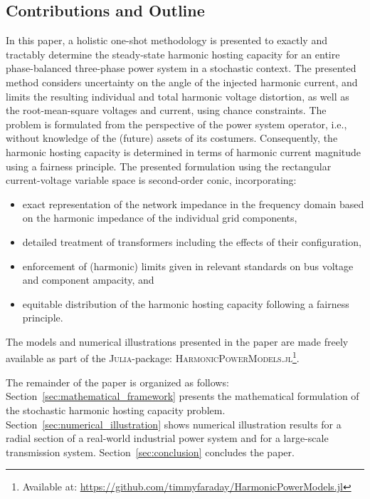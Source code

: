 \subsection{Contributions and Outline}
\label{sec:contribution_and_outline}

In this paper, a holistic one-shot methodology is presented to exactly and tractably determine the steady-state harmonic hosting capacity for an entire phase-balanced three-phase power system in a stochastic context. The presented method considers uncertainty on the angle of the injected harmonic current, and limits the resulting individual and total harmonic voltage distortion, as well as the root-mean-square voltages and current, using chance constraints. The problem is formulated from the perspective of the power system operator, i.e., without knowledge of the (future) assets of its costumers. Consequently, the harmonic hosting capacity is determined in terms of harmonic current magnitude using a fairness principle. The presented formulation using the rectangular current-voltage variable space is second-order conic, incorporating:
\begin{itemize}
    \item exact representation of the network impedance in the frequency domain based on the harmonic impedance of the individual grid components,
    \item detailed treatment of transformers including the effects of their configuration,
    \item enforcement of (harmonic) limits given in relevant standards on bus voltage and component ampacity, and
    \item equitable distribution of the harmonic hosting capacity following a fairness principle. 
\end{itemize}
The models and numerical illustrations presented in the paper are made freely available as part of the \textsc{Julia}-package: \textsc{HarmonicPowerModels.jl}\footnote{Available at: \href{https://github.com/timmyfaraday/HarmonicPowerModels.jl}{https://github.com/timmyfaraday/HarmonicPowerModels.jl}}.

The remainder of the paper is organized as follows: Section~\ref{sec:mathematical_framework} presents the mathematical formulation of the stochastic harmonic hosting capacity problem. Section~\ref{sec:numerical_illustration} shows numerical illustration results for a radial section of a real-world industrial power system and for a large-scale transmission system. Section~\ref{sec:conclusion} concludes the paper.
